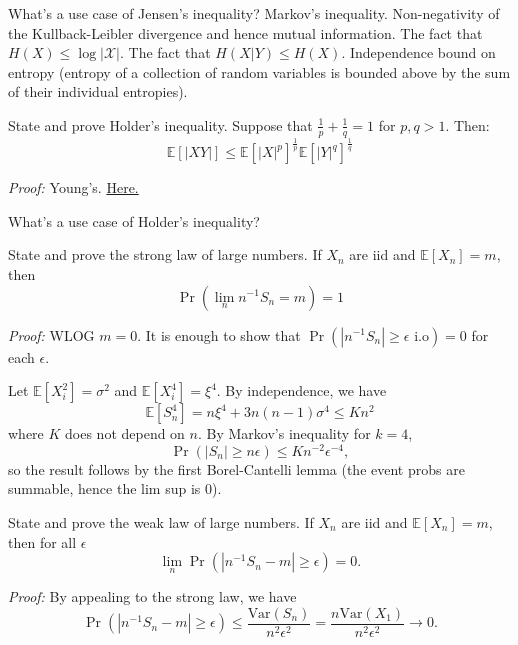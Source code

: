 \documentclass[avery5388,grid,frame]{flashcards}
\newcommand{\E}{\mathbb{E}}
\newcommand{\Var}{\text{Var}}
\begin{document}
\begin{flashcard}
    {What's a use case of Jensen's inequality?}
    Markov's inequality. Non-negativity of the Kullback-Leibler divergence and hence mutual information. The fact that $H(X) \leq \log | \mathcal X |$. The fact that $H(X | Y) \leq H(X)$. Independence bound on entropy (entropy of a collection of random variables is bounded above by the sum of their individual entropies).
\end{flashcard}


\begin{flashcard}
    {State and prove Holder's inequality.}
    Suppose that $\frac 1 p + \frac 1 q = 1$ for $p,q>1$. Then:
    $$\E[|XY|] \leq \E[|X|^p]^{\frac 1 p} \E[|Y|^q]^{\frac 1 q}$$

    \emph{Proof:} Young's. \href{https://en.wikipedia.org/wiki/H%C3%B6lder%27s_inequality#Proof_of_H%C3%B6lder's_inequality}{Here.}
\end{flashcard}


\begin{flashcard}
    {What's a use case of Holder's inequality?}
\end{flashcard}


\begin{flashcard}
    {State and prove the strong law of large numbers.}
    If $X_n$ are iid and $\E[X_n] = m$, then
    $$\Pr(\lim_n n^{-1} S_n = m) = 1$$

    \emph{Proof:} WLOG $m=0$. It is enough to show that $\Pr(|n^{-1} S_n| \geq \epsilon \text{ i.o}) = 0$ for each $\epsilon$.

    Let $\E[X_i^2] = \sigma^2$ and $\E[X_i^4] = \xi^4$. By independence, we have
    $$\E[S_n^4] = n \xi^4 + 3n(n-1) \sigma^4 \leq K n^2$$
    where $K$ does not depend on $n$. By Markov's inequality for $k=4$,
    $$\Pr(|S_n| \geq n \epsilon) \leq K n^{-2} \epsilon^{-4},$$
    so the result follows by the first Borel-Cantelli lemma (the event probs are summable, hence the lim sup is $0$).
\end{flashcard}


\begin{flashcard}
    {State and prove the weak law of large numbers.}
    If $X_n$ are iid and $\E[X_n] = m$, then for all $\epsilon$
    $$\lim_n \Pr(| n^{-1} S_n - m| \geq \epsilon) = 0.$$

    \emph{Proof:} By appealing to the strong law, we have
    $$\Pr(| n^{-1} S_n - m| \geq \epsilon) \leq \frac{\Var(S_n)}{n^2 \epsilon^2} = \frac{n \Var(X_1)}{n^2 \epsilon^2} \rightarrow 0.$$
\end{flashcard}
\end{document}
